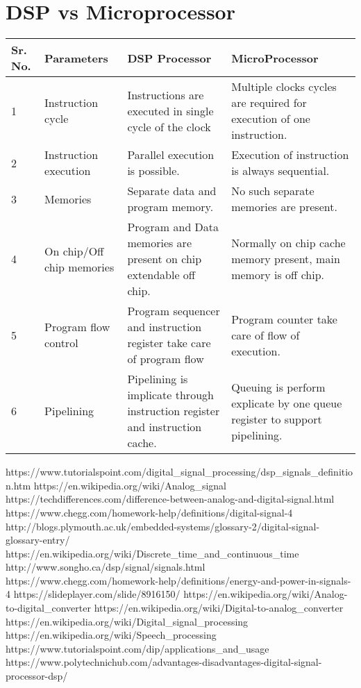 \documentclass{article}
\begin{document}
    \section{DSP vs Microprocessor}
        \begin{tabular}{ ||p{1cm}|p{4cm}|p{6cm}|p{6cm}||}
            \hline
            \textbf{Sr. No.}&\textbf{Parameters}&\textbf{DSP Processor}&\textbf{MicroProcessor}\\
            \hline
            1&Instruction cycle&Instructions are executed in single cycle of the clock&Multiple clocks cycles are required for execution of one instruction.\\\hline
            2&Instruction execution&Parallel execution is possible.&Execution of instruction is always sequential.\\\hline
            3&Memories&Separate data and program memory.&No such separate memories are present.\\\hline
            4&On chip/Off chip memories&Program and Data memories are present on chip extendable off chip.&Normally on chip cache memory present, main memory is off chip.\\\hline
            5&Program flow control&Program sequencer and instruction register take care of program flow&Program counter take care of flow of execution.\\\hline
            6&Pipelining&Pipelining is implicate through instruction register and instruction cache.&Queuing is perform explicate by one queue register to support pipelining.\\
            \hline
        \end{tabular}

    \begin{thebibliography}{9}
     https://www.tutorialspoint.com/digital\_signal\_processing/dsp\_signals\_definition.htm
     https://en.wikipedia.org/wiki/Analog\_signal
     https://techdifferences.com/difference-between-analog-and-digital-signal.html
     https://www.chegg.com/homework-help/definitions/digital-signal-4
     http://blogs.plymouth.ac.uk/embedded-systems/glossary-2/digital-signal-glossary-entry/
     https://en.wikipedia.org/wiki/Discrete\_time\_and\_continuous\_time
     http://www.songho.ca/dsp/signal/signals.html
     https://www.chegg.com/homework-help/definitions/energy-and-power-in-signals-4
     https://slideplayer.com/slide/8916150/
     https://en.wikipedia.org/wiki/Analog-to-digital\_converter
     https://en.wikipedia.org/wiki/Digital-to-analog\_converter
     https://en.wikipedia.org/wiki/Digital\_signal\_processing
     https://en.wikipedia.org/wiki/Speech\_processing
     https://www.tutorialspoint.com/dip/applications\_and\_usage
     https://www.polytechnichub.com/advantages-disadvantages-digital-signal-processor-dsp/
    \end{thebibliography}
\end{document}
